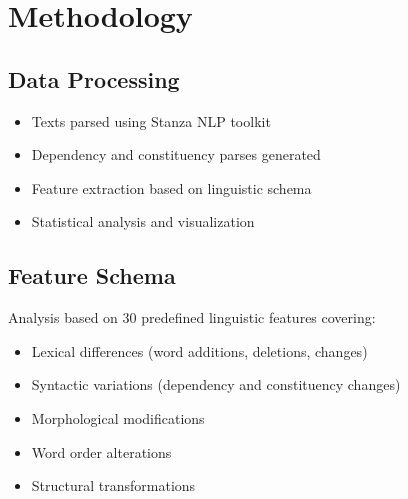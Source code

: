 \documentclass[11pt,a4paper]{article}
\begin{document}
\section{Methodology}

\subsection{Data Processing}
\begin{itemize}
\item Texts parsed using Stanza NLP toolkit
\item Dependency and constituency parses generated
\item Feature extraction based on linguistic schema
\item Statistical analysis and visualization
\end{itemize}

\subsection{Feature Schema}
Analysis based on 30 predefined linguistic features covering:
\begin{itemize}
\item Lexical differences (word additions, deletions, changes)
\item Syntactic variations (dependency and constituency changes)
\item Morphological modifications
\item Word order alterations
\item Structural transformations
\end{itemize}
\end{document}
